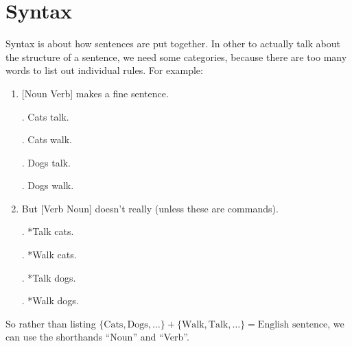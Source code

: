 \chapter{Syntax}

Syntax is about how sentences are put together. In other to actually talk about the structure of a sentence, we need some categories, because there are too many words to list out individual rules. For example:

\begin{enumerate}[label = \textbullet, itemsep = 2pt]
	\item {[Noun Verb]} makes a fine sentence.
		
		\ex. Cats talk.

		\ex. Cats walk.

		\ex. Dogs talk.

		\ex. Dogs walk.

	\item But [Verb Noun] doesn't really (unless these are commands).

		\ex. *Talk cats.

		\ex. *Walk cats.

		\ex. *Talk dogs.

		\ex. *Walk dogs.

\end{enumerate}

So rather than listing \(\{\text{Cats}, \text{Dogs}, \dots\} + \{\text{Walk}, \text{Talk}, \dots\} = \text{English sentence}\), we can use the shorthands ``Noun'' and ``Verb''.






